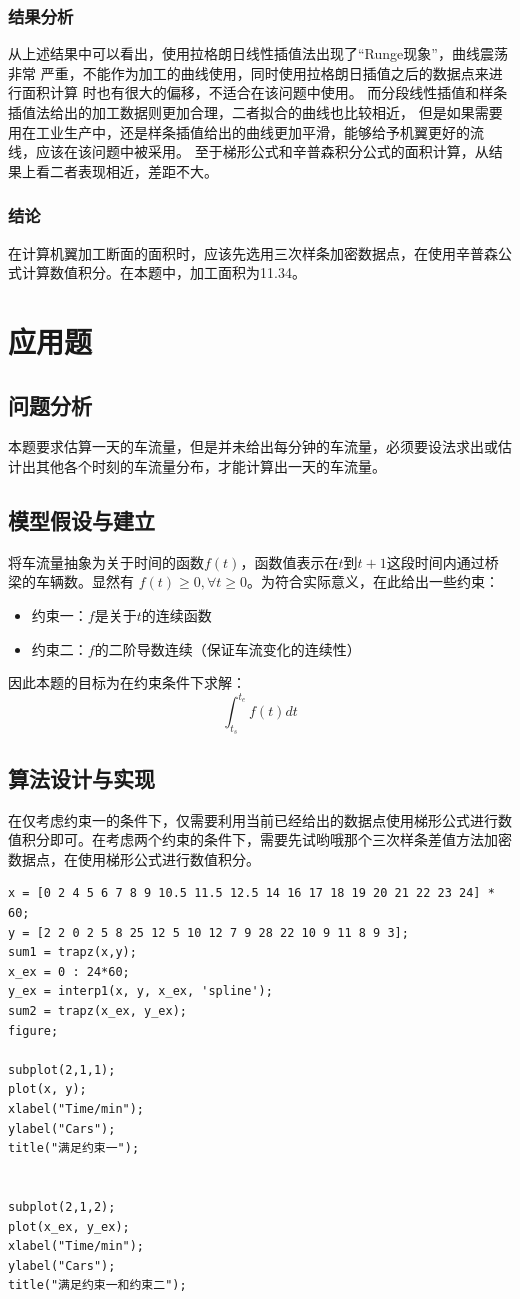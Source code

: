 \documentclass{article}
\begin{document}
\subsubsection{结果分析}

从上述结果中可以看出，使用拉格朗日线性插值法出现了“Runge现象”，曲线震荡非常 严重，不能作为加工的曲线使用，同时使用拉格朗日插值之后的数据点来进行面积计算 时也有很大的偏移，不适合在该问题中使用。
而分段线性插值和样条插值法给出的加工数据则更加合理，二者拟合的曲线也比较相近， 但是如果需要用在工业生产中，还是样条插值给出的曲线更加平滑，能够给予机翼更好的流 线，应该在该问题中被采用。
至于梯形公式和辛普森积分公式的面积计算，从结果上看二者表现相近，差距不大。
\subsubsection{结论}

在计算机翼加工断面的面积时，应该先选用三次样条加密数据点，在使用辛普森公式计算数值积分。在本题中，加工面积为11.34。

\newpage
\section{应用题}

\subsection{问题分析}
本题要求估算一天的车流量，但是并未给出每分钟的车流量，必须要设法求出或估计出其他各个时刻的车流量分布，才能计算出一天的车流量。
\subsection{模型假设与建立}
将车流量抽象为关于时间的函数$f(t)$，函数值表示在$t$到$t+1$这段时间内通过桥梁的车辆数。显然有 $f(t)\geq0, \forall t \geq 0$。为符合实际意义，在此给出一些约束：
\begin{itemize}
	\item{约束一：$f$是关于$t$的连续函数}
	\item{约束二：$f$的二阶导数连续（保证车流变化的连续性）}
\end{itemize}
因此本题的目标为在约束条件下求解：$$\int_{t_{s}}^{t_{e}}f(t)dt$$
\subsection{算法设计与实现}
在仅考虑约束一的条件下，仅需要利用当前已经给出的数据点使用梯形公式进行数值积分即可。在考虑两个约束的条件下，需要先试哟哦那个三次样条差值方法加密数据点，在使用梯形公式进行数值积分。
\begin{lstlisting}
x = [0 2 4 5 6 7 8 9 10.5 11.5 12.5 14 16 17 18 19 20 21 22 23 24] * 60;
y = [2 2 0 2 5 8 25 12 5 10 12 7 9 28 22 10 9 11 8 9 3];
sum1 = trapz(x,y);
x_ex = 0 : 24*60;
y_ex = interp1(x, y, x_ex, 'spline');
sum2 = trapz(x_ex, y_ex);
figure;

subplot(2,1,1);
plot(x, y);
xlabel("Time/min");
ylabel("Cars");
title("满足约束一");


subplot(2,1,2);
plot(x_ex, y_ex);
xlabel("Time/min");
ylabel("Cars");
title("满足约束一和约束二");

\end{lstlisting}
\end{document}
